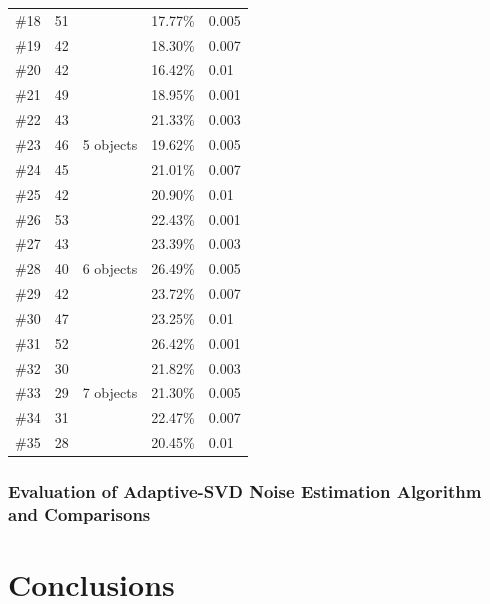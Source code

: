 \documentclass[a4paper, 12pt, twoside]{report}
\begin{document}
\begin{table}[htbp]
{\begin{tabular}{m{}<{\centering}m{}<{\centering}m{}<{\centering}m{}<{\centering}m{}<{\centering}}
		\cline{1-2}\cline{4-5}    \#18  & 51    &       & 17.77\% & 0.005 \bigstrut\\
		\cline{1-2}\cline{4-5}    \#19  & 42    &       & 18.30\% & 0.007 \bigstrut\\
		\cline{1-2}\cline{4-5}    \#20  & 42    &       & 16.42\% & 0.01 \bigstrut\\
		\hline
		\#21  & 49    & \multirow{5}[10]{*}{5 objects} & 18.95\% & 0.001 \bigstrut\\
		\cline{1-2}\cline{4-5}    \#22  & 43    &       & 21.33\% & 0.003 \bigstrut\\
		\cline{1-2}\cline{4-5}    \#23  & 46    &       & 19.62\% & 0.005 \bigstrut\\
		\cline{1-2}\cline{4-5}    \#24  & 45    &       & 21.01\% & 0.007 \bigstrut\\
		\cline{1-2}\cline{4-5}    \#25  & 42    &       & 20.90\% & 0.01 \bigstrut\\
		\hline
		\#26  & 53    & \multirow{5}[10]{*}{6 objects} & 22.43\% & 0.001 \bigstrut\\
		\cline{1-2}\cline{4-5}    \#27  & 43    &       & 23.39\% & 0.003 \bigstrut\\
		\cline{1-2}\cline{4-5}    \#28  & 40    &       & 26.49\% & 0.005 \bigstrut\\
		\cline{1-2}\cline{4-5}    \#29  & 42    &       & 23.72\% & 0.007 \bigstrut\\
		\cline{1-2}\cline{4-5}    \#30  & 47    &       & 23.25\% & 0.01 \bigstrut\\
		\hline
		\#31  & 52    & \multirow{5}[10]{*}{7 objects} & 26.42\% & 0.001 \bigstrut\\
		\cline{1-2}\cline{4-5}    \#32  & 30    &       & 21.82\% & 0.003 \bigstrut\\
		\cline{1-2}\cline{4-5}    \#33  & 29    &       & 21.30\% & 0.005 \bigstrut\\
		\cline{1-2}\cline{4-5}    \#34  & 31    &       & 22.47\% & 0.007 \bigstrut\\
		\cline{1-2}\cline{4-5}    \#35  & 28    &       & 20.45\% & 0.01 \bigstrut\\
		\hline
	\end{tabular}%
	}
	\label{svd_tab1}%
\end{table}

\subsection{Evaluation of Adaptive-SVD Noise Estimation Algorithm and Comparisons}
\lipsum[1]

\lipsum[2]

\chapter{Conclusions}
\lipsum[1]

\lipsum[2]

\lipsum[3]

\lipsum[4]

\linespread{1}\selectfont

\setlength{\bibhang}{0pt}

\end{document}

